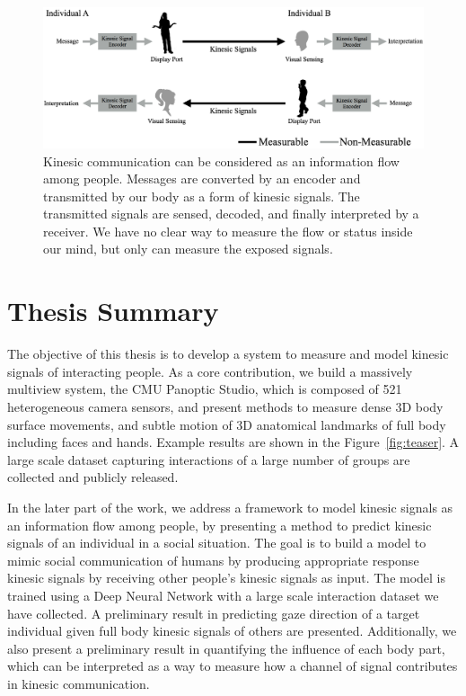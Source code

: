 \begin{figure}[t]
	\centering
	\includegraphics[trim=0 0 0 0, clip=true, width=\textwidth]{figures/kinesicflow2}
	\caption{Kinesic communication can be considered as an information flow among people. Messages are converted by an encoder and transmitted by our body as a form of kinesic signals. The transmitted signals are sensed, decoded, and finally interpreted by a receiver. We have no clear way to measure the flow or status inside our mind, but only can measure the exposed signals.}	
	\label{fig:kinesicflow}
\end{figure}


\section{Thesis  Summary}

The objective of this thesis is to develop a system to measure and model kinesic signals of interacting people. As a core contribution, we build a massively multiview system, the CMU Panoptic Studio, which is composed of 521 heterogeneous camera sensors, and present methods to measure dense 3D body surface movements, and subtle motion of 3D anatomical landmarks of full body including faces and hands. Example results are shown in the Figure~\ref{fig:teaser}. A large scale dataset capturing interactions of a large number of groups are collected and publicly released.

In the later part of the work, we address a framework to model kinesic signals as an information flow among people, by presenting a method to predict kinesic signals of an individual in a social situation. The goal is to build a model to mimic social communication of humans by producing appropriate response kinesic signals by receiving other people's kinesic signals as input. The model is trained using a Deep Neural Network with a large scale interaction dataset we have collected. A preliminary result in predicting gaze direction of a target individual given full body kinesic signals of others are presented. Additionally, we also present a preliminary result in quantifying the influence of each body part, which can be interpreted as a way to measure how a channel of signal contributes in kinesic communication. 

